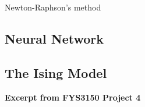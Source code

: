 Newton-Raphson's method



\subsection{Neural Network}\label{sec:dnn theory}



\subsection{The Ising Model}\label{sec:ising theory}


\textbf{Excerpt from FYS3150 Project 4}

